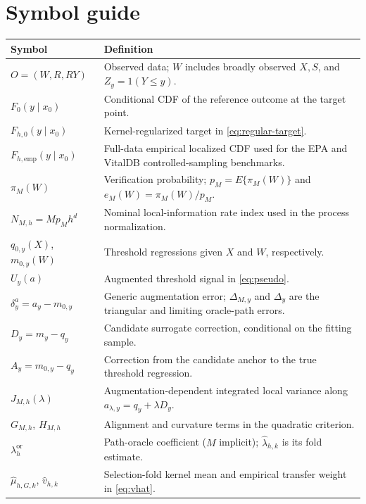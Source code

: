 \section{Symbol guide}
\label{sec:supp-symbols}

\begin{center}
\footnotesize
\begin{tabular}{>{\raggedright\arraybackslash}p{3.0cm}>{\raggedright\arraybackslash}p{10.5cm}}
\toprule
Symbol & Definition \\
\midrule
$O=(W,R,RY)$ & Observed data; $W$ includes broadly observed $X,S$, and $Z_y=1(Y\le y)$. \\
$F_0(y\mid x_0)$ & Conditional CDF of the reference outcome at the target point. \\
$F_{h,0}(y\mid x_0)$ & Kernel-regularized target in \eqref{eq:regular-target}. \\
$F_{h,\mathrm{emp}}(y\mid x_0)$ & Full-data empirical localized CDF used for the EPA and VitalDB controlled-sampling benchmarks. \\
$\pi_M(W)$ & Verification probability; $p_M=E\{\pi_M(W)\}$ and $e_M(W)=\pi_M(W)/p_M$. \\
$N_{M,h}=Mp_Mh^d$ & Nominal local-information rate index used in the process normalization. \\
$q_{0,y}(X)$, $m_{0,y}(W)$ & Threshold regressions given $X$ and $W$, respectively. \\
$U_y(a)$ & Augmented threshold signal in \eqref{eq:pseudo}. \\
$\delta_y^a=a_y-m_{0,y}$ & Generic augmentation error; $\Delta_{M,y}$ and $\Delta_y$ are the triangular and limiting oracle-path errors. \\
$D_y=m_y-q_y$ & Candidate surrogate correction, conditional on the fitting sample. \\
$A_y=m_{0,y}-q_y$ & Correction from the candidate anchor to the true threshold regression. \\
$J_{M,h}(\lambda)$ & Augmentation-dependent integrated local variance along $a_{\lambda,y}=q_y+\lambda D_y$. \\
$G_{M,h}$, $H_{M,h}$ & Alignment and curvature terms in the quadratic criterion. \\
$\lambda_h^{\mathrm{or}}$ & Path-oracle coefficient ($M$ implicit); $\widehat\lambda_{h,k}$ is its fold estimate. \\
$\widehat\mu_{h,G,k}$, $\widehat v_{h,k}$ & Selection-fold kernel mean and empirical transfer weight in \eqref{eq:vhat}. \\

\end{tabular}
\end{center}
